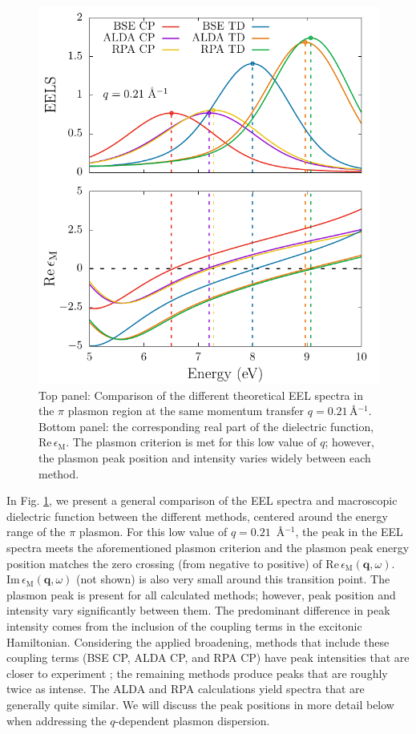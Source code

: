 \documentclass[aps,prb,10pt,showpacs,superscriptaddress,twocolumn,notitlepage]{revtex4-1}
\begin{document}
\begin{figure}[t]
\includegraphics[width=\linewidth]{fig02}
\caption{Top panel:
Comparison of the different theoretical EEL spectra in the $\pi$ plasmon region
at the same momentum transfer $q = 0.21$\,\r{A}$^{-1}$.
Bottom panel: the corresponding real part of the dielectric
function, $\mathrm{Re}\,\epsilon_{\mathrm{M}}$. The plasmon criterion is met for
this low value of $q$; however, the plasmon peak position and intensity varies
widely between each method.}
\label{fig:comparison}
\end{figure}

In Fig. \ref{fig:comparison}, we present a general comparison of the EEL spectra
and macroscopic dielectric function between the different methods, centered
around the energy range of the $\pi$ plasmon. For this low value of $q = 0.21$\,
\r{A}$^{-1}$, the peak in the EEL spectra meets the aforementioned plasmon
criterion and the plasmon peak energy position matches the zero crossing (from
negative to positive) of $\mathrm{Re}\,\epsilon_{\mathrm{M}}(\mathbf{q},
\omega)$. $\mathrm{Im}\,\epsilon_{\mathrm{M}}(\mathbf{q}, \omega)$ (not shown)
is also very small around this transition point. The plasmon peak is present for
all calculated methods; however, peak position and intensity vary significantly
between them. The predominant difference in peak intensity comes from the
inclusion of the coupling terms in the excitonic Hamiltonian.
{\color{red}
Considering the applied broadening, methods that include these coupling terms
(BSE CP, ALDA CP, and RPA CP) have peak intensities that are closer to
experiment \cite{zeppenfeldZP71, buchnerPSSB77, marinopoulosPRB04}; the
remaining methods produce peaks that are roughly twice as intense.
}
The ALDA and RPA calculations yield spectra
that are generally quite similar. We will discuss the peak positions in more
detail below when addressing the $q$-dependent plasmon dispersion.
\end{document}

